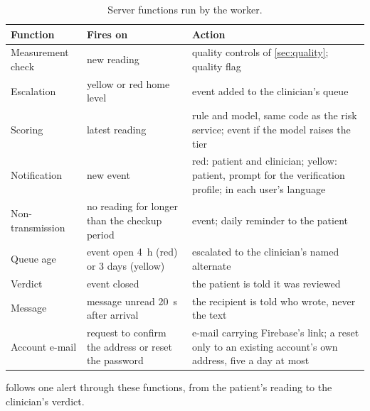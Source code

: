 \documentclass[11pt,a4paper,oneside]{report}
\begin{document}
\begin{table}[htbp]
\centering\footnotesize
\caption{Server functions run by the worker.}\label{tab:triggers}
\begin{tabularx}{\textwidth}{@{}>{\raggedright\arraybackslash}p{3.0cm} >{\raggedright\arraybackslash}p{3.2cm} X@{}}
\toprule
\textbf{Function} & \textbf{Fires on} & \textbf{Action} \\
\midrule
Measurement check & new reading & quality controls of \cref{sec:quality}; quality flag \\
Escalation & yellow or red home level & event added to the clinician's queue \\
Scoring & latest reading & rule and model, same code as the risk service; event if the model raises the tier \\
Notification & new event & red: patient and clinician; yellow: patient, prompt for the verification profile; in each user's language \\
Non-transmission & no reading for longer than the checkup period & event; daily reminder to the patient \\
Queue age & event open 4~h (red) or 3 days (yellow) & escalated to the clinician's named alternate \\
Verdict & event closed & the patient is told it was reviewed \\
Message & message unread 20~s after arrival & the recipient is told who wrote, never the text \\
Account e-mail & request to confirm the address or reset the password & e-mail carrying Firebase's link; a reset only to an existing account's own address, five a day at most \\
\bottomrule
\end{tabularx}
\end{table}

 follows one alert through these functions, from the patient's reading to the clinician's verdict.
\end{document}
